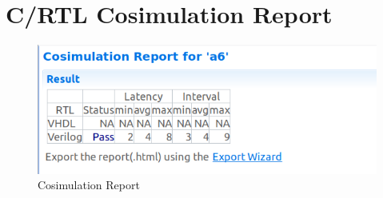 \documentclass{article}
\begin{document}
\section{C/RTL Cosimulation Report}
\vspace{1cm}
\begin{figure}[h]
    \centering
\includegraphics[width=\columnwidth]{figs/4.png}
    \caption{Cosimulation Report}
    \label{fig:my_label}
\end{figure}
\end{document}
